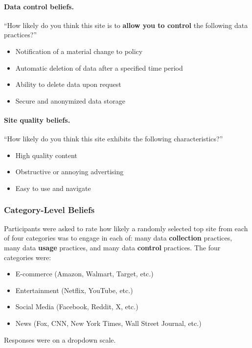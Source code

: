 \documentclass[12pt]{article}
\theoremstyle{definition}
\theoremstyle{remark}
\begin{document}
\begin{appendix}
\paragraph{Data control beliefs.} ``How likely do you think this site is to \textbf{allow you to control} the following data practices?''
\begin{itemize}[leftmargin=2em,itemsep=1pt]
    \item Notification of a material change to policy
    \item Automatic deletion of data after a specified time period
    \item Ability to delete data upon request
    \item Secure and anonymized data storage
\end{itemize}

\paragraph{Site quality beliefs.} ``How likely do you think this site exhibits the following characteristics?''
\begin{itemize}[leftmargin=2em,itemsep=1pt]
    \item High quality content
    \item Obstructive or annoying advertising
    \item Easy to use and navigate
\end{itemize}

\subsubsection{Category-Level Beliefs}\label{sec:survey_category_beliefs}

Participants were asked to rate how likely a randomly selected top site from each of four categories was to engage in each of: many data \textbf{collection} practices, many data \textbf{usage} practices, and many data \textbf{control} practices. The four categories were:
\begin{itemize}[leftmargin=2em,itemsep=1pt]
    \item E-commerce (Amazon, Walmart, Target, etc.)
    \item Entertainment (Netflix, YouTube, etc.)
    \item Social Media (Facebook, Reddit, X, etc.)
    \item News (Fox, CNN, New York Times, Wall Street Journal, etc.)
\end{itemize}
Responses were on a dropdown scale.


\end{appendix}
\end{document}

